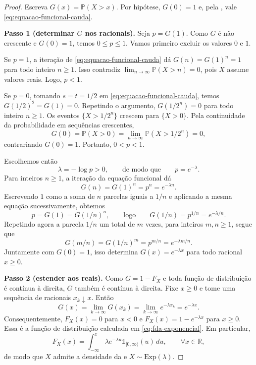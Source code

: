 \documentclass[12pt,portuguese]{article}
\theoremstyle{definition}
\theoremstyle{plainexercise}
\theoremstyle{starredexercise}
\theoremstyle{definition}
\begin{document}
\begin{proof}
Escreva $G(x)=\mathbb{P}(X>x)$. Por hipótese, $G(0)=1$ e, pela
, vale
\eqref{eq:equacao-funcional-cauda}.

\smallskip
\noindent\textbf{Passo 1 (determinar $G$ nos racionais).}
Seja $p=G(1)$. Como $G$ é não crescente e $G(0)=1$, temos
$0\leqslant p\leqslant1$. Vamos primeiro excluir os valores $0$ e $1$.

Se $p=1$, a iteração de \eqref{eq:equacao-funcional-cauda} dá
$G(n)=G(1)^n=1$ para todo inteiro $n\geqslant1$. Isso contradiz
$\lim_{n\to\infty}\mathbb{P}(X>n)=0$, pois $X$ assume valores reais.
Logo, $p<1$.

Se $p=0$, tomando $s=t=1/2$ em
\eqref{eq:equacao-funcional-cauda}, temos $G(1/2)^2=G(1)=0$.
Repetindo o argumento, $G(1/2^n)=0$ para todo inteiro $n\geqslant1$.
Os eventos $\{X>1/2^n\}$ crescem para $\{X>0\}$. Pela continuidade da
probabilidade em sequências crescentes,
\[
  G(0)=\mathbb{P}(X>0)
  =\lim_{n\to\infty}\mathbb{P}(X>1/2^n)=0,
\]
contrariando $G(0)=1$. Portanto, $0<p<1$.

Escolhemos então
\[
  \lambda=-\log p>0,\qquad\text{de modo que}\qquad p=e^{-\lambda}.
\]
Para inteiros $n\geqslant1$, a iteração da equação funcional dá
\[
  G(n)=G(1)^n=p^n=e^{-\lambda n}.
\]
Escrevendo $1$ como a soma de $n$ parcelas iguais a $1/n$ e aplicando a
mesma equação sucessivamente, obtemos
\[
  p=G(1)=G(1/n)^n,\qquad\text{logo}\qquad
  G(1/n)=p^{1/n}=e^{-\lambda/n}.
\]
Repetindo agora a parcela $1/n$ um total de $m$ vezes, para inteiros
$m,n\geqslant1$, segue que
\[
  G(m/n)=G(1/n)^m=p^{m/n}=e^{-\lambda m/n}.
\]
Juntamente com $G(0)=1$, isso determina $G(x)=e^{-\lambda x}$ para todo
racional $x\geqslant0$.

\smallskip
\noindent\textbf{Passo 2 (estender aos reais).}
Como $G=1-F_X$ e toda função de distribuição é contínua à direita, $G$
também é contínua à direita. Fixe $x\geqslant0$ e tome uma sequência de
racionais $x_k\downarrow x$. Então
\[
  G(x)=\lim_{k\to\infty}G(x_k)
  =\lim_{k\to\infty}e^{-\lambda x_k}=e^{-\lambda x}.
\]
Consequentemente, $F_X(x)=0$ para $x<0$ e
$F_X(x)=1-e^{-\lambda x}$ para $x\geqslant0$. Essa é a função de
distribuição calculada em \eqref{eq:fda-exponencial}. Em particular,
\[
  F_X(x)=\int_{-\infty}^{x}
  \lambda e^{-\lambda u}\mathds{1}_{[0,\infty)}(u)\,du,
  \qquad\forall x\in\mathbb{R},
\]
de modo que $X$ admite a densidade da
 e $X\sim\mathrm{Exp}(\lambda)$.
\end{proof}
\end{document}
